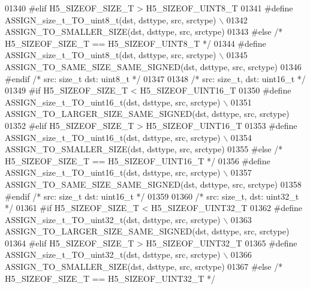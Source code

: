 \begin{DoxyCode}
01340 \textcolor{preprocessor}{#elif H5\_SIZEOF\_SIZE\_T > H5\_SIZEOF\_UINT8\_T}
01341 \textcolor{preprocessor}{    #define ASSIGN\_size\_t\_TO\_uint8\_t(dst, dsttype, src, srctype) \(\backslash\)}
01342 \textcolor{preprocessor}{        ASSIGN\_TO\_SMALLER\_SIZE(dst, dsttype, src, srctype)}
01343 \textcolor{preprocessor}{#else }\textcolor{comment}{/* H5\_SIZEOF\_SIZE\_T == H5\_SIZEOF\_UINT8\_T */}\textcolor{preprocessor}{}
01344 \textcolor{preprocessor}{    #define ASSIGN\_size\_t\_TO\_uint8\_t(dst, dsttype, src, srctype) \(\backslash\)}
01345 \textcolor{preprocessor}{        ASSIGN\_TO\_SAME\_SIZE\_SAME\_SIGNED(dst, dsttype, src, srctype)}
01346 \textcolor{preprocessor}{#endif }\textcolor{comment}{/* src: size\_t dst: uint8\_t */}\textcolor{preprocessor}{}
01347 
01348 \textcolor{comment}{/* src: size\_t, dst: uint16\_t */}
01349 \textcolor{preprocessor}{#if H5\_SIZEOF\_SIZE\_T < H5\_SIZEOF\_UINT16\_T}
01350 \textcolor{preprocessor}{    #define ASSIGN\_size\_t\_TO\_uint16\_t(dst, dsttype, src, srctype) \(\backslash\)}
01351 \textcolor{preprocessor}{        ASSIGN\_TO\_LARGER\_SIZE\_SAME\_SIGNED(dst, dsttype, src, srctype)}
01352 \textcolor{preprocessor}{#elif H5\_SIZEOF\_SIZE\_T > H5\_SIZEOF\_UINT16\_T}
01353 \textcolor{preprocessor}{    #define ASSIGN\_size\_t\_TO\_uint16\_t(dst, dsttype, src, srctype) \(\backslash\)}
01354 \textcolor{preprocessor}{        ASSIGN\_TO\_SMALLER\_SIZE(dst, dsttype, src, srctype)}
01355 \textcolor{preprocessor}{#else }\textcolor{comment}{/* H5\_SIZEOF\_SIZE\_T == H5\_SIZEOF\_UINT16\_T */}\textcolor{preprocessor}{}
01356 \textcolor{preprocessor}{    #define ASSIGN\_size\_t\_TO\_uint16\_t(dst, dsttype, src, srctype) \(\backslash\)}
01357 \textcolor{preprocessor}{        ASSIGN\_TO\_SAME\_SIZE\_SAME\_SIGNED(dst, dsttype, src, srctype)}
01358 \textcolor{preprocessor}{#endif }\textcolor{comment}{/* src: size\_t dst: uint16\_t */}\textcolor{preprocessor}{}
01359 
01360 \textcolor{comment}{/* src: size\_t, dst: uint32\_t */}
01361 \textcolor{preprocessor}{#if H5\_SIZEOF\_SIZE\_T < H5\_SIZEOF\_UINT32\_T}
01362 \textcolor{preprocessor}{    #define ASSIGN\_size\_t\_TO\_uint32\_t(dst, dsttype, src, srctype) \(\backslash\)}
01363 \textcolor{preprocessor}{        ASSIGN\_TO\_LARGER\_SIZE\_SAME\_SIGNED(dst, dsttype, src, srctype)}
01364 \textcolor{preprocessor}{#elif H5\_SIZEOF\_SIZE\_T > H5\_SIZEOF\_UINT32\_T}
01365 \textcolor{preprocessor}{    #define ASSIGN\_size\_t\_TO\_uint32\_t(dst, dsttype, src, srctype) \(\backslash\)}
01366 \textcolor{preprocessor}{        ASSIGN\_TO\_SMALLER\_SIZE(dst, dsttype, src, srctype)}
01367 \textcolor{preprocessor}{#else }\textcolor{comment}{/* H5\_SIZEOF\_SIZE\_T == H5\_SIZEOF\_UINT32\_T */}\textcolor{preprocessor}{}

\end{DoxyCode}
